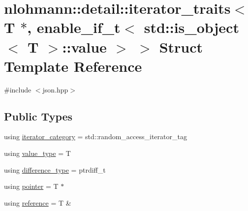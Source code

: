 \hypertarget{structnlohmann_1_1detail_1_1iterator__traits_3_01_t_01_5_00_01enable__if__t_3_01std_1_1is__objec8d960665487688165530972cda4f1bea}{}\section{nlohmann\+::detail\+::iterator\+\_\+traits$<$ T $\ast$, enable\+\_\+if\+\_\+t$<$ std\+::is\+\_\+object$<$ T $>$\+::value $>$ $>$ Struct Template Reference}
\label{structnlohmann_1_1detail_1_1iterator__traits_3_01_t_01_5_00_01enable__if__t_3_01std_1_1is__objec8d960665487688165530972cda4f1bea}


{\ttfamily \#include $<$json.\+hpp$>$}

\subsection*{Public Types}
\begin{DoxyCompactItemize}
\item 
using \mbox{\hyperlink{structnlohmann_1_1detail_1_1iterator__traits_3_01_t_01_5_00_01enable__if__t_3_01std_1_1is__objec8d960665487688165530972cda4f1bea_a9b043cfe0fdfb3e9665428fb2be9cea1}{iterator\+\_\+category}} = std\+::random\+\_\+access\+\_\+iterator\+\_\+tag
\item 
using \mbox{\hyperlink{structnlohmann_1_1detail_1_1iterator__traits_3_01_t_01_5_00_01enable__if__t_3_01std_1_1is__objec8d960665487688165530972cda4f1bea_a443e6a62f5fb2c545fc71c751b98ca8d}{value\+\_\+type}} = T
\item 
using \mbox{\hyperlink{structnlohmann_1_1detail_1_1iterator__traits_3_01_t_01_5_00_01enable__if__t_3_01std_1_1is__objec8d960665487688165530972cda4f1bea_ae7be99eb434f5b5f34692874c272b759}{difference\+\_\+type}} = ptrdiff\+\_\+t
\item 
using \mbox{\hyperlink{structnlohmann_1_1detail_1_1iterator__traits_3_01_t_01_5_00_01enable__if__t_3_01std_1_1is__objec8d960665487688165530972cda4f1bea_a33ee9a1beb8ee099f989fd4af15178a5}{pointer}} = T $\ast$
\item 
using \mbox{\hyperlink{structnlohmann_1_1detail_1_1iterator__traits_3_01_t_01_5_00_01enable__if__t_3_01std_1_1is__objec8d960665487688165530972cda4f1bea_a0809c5949d22f08a993231d2fdf285f0}{reference}} = T \&
\end{DoxyCompactItemize}


